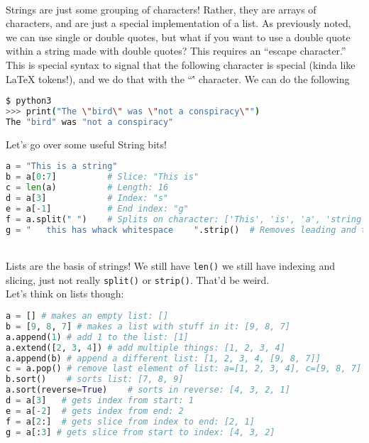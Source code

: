 \documentclass[12pt]{article}
\begin{document}
\\

Strings are just some grouping of characters! Rather, they are arrays of characters, and are just a special implementation of a list. As previously noted, we can use single or double quotes, but what if you want to use a double quote within a string made with double quotes? This requires an ``escape character.'' This is special syntax to signal that the following character is special (kinda like LaTeX tokens!), and we do that with the ``\'' character. We can do the following\\
\begin{lstlisting}[language=sh]
$ python3
>>> print("The \"bird\" was \"not a conspiracy\"")
The "bird" was "not a conspiracy"
\end{lstlisting}
Let's go over some useful String bits!\\
\begin{lstlisting}[language=Python]
a = "This is a string"
b = a[0:7]          # Slice: "This is"
c = len(a)          # Length: 16
d = a[3]            # Index: "s"
e = a[-1]           # End index: "g"
f = a.split(" ")    # Splits on character: ['This', 'is', 'a', 'string']
g = "   this has whack whitespace    ".strip()  # Removes leading and trailing whitespace
\end{lstlisting}

\\

Lists are the basis of strings! We still have \texttt{len()} we still have indexing and slicing, just not really \texttt{split()} or \texttt{strip()}. That'd be weird.\\
Let's think on lists though:\\
\begin{lstlisting}[language=Python]
a = [] # makes an empty list: []
b = [9, 8, 7] # makes a list with stuff in it: [9, 8, 7]
a.append(1) # add 1 to the list: [1]
a.extend([2, 3, 4]) # add multiple things: [1, 2, 3, 4]
a.append(b) # append a different list: [1, 2, 3, 4, [9, 8, 7]]
c = a.pop() # remove last element of list: a=[1, 2, 3, 4], c=[9, 8, 7]
b.sort()    # sorts list: [7, 8, 9]
a.sort(reverse=True)    # sorts in reverse: [4, 3, 2, 1]
d = a[3]   # gets index from start: 1
e = a[-2]  # gets index from end: 2
f = a[2:]  # gets slice from index to end: [2, 1]
g = a[:3] # gets slice from start to index: [4, 3, 2]
\end{lstlisting}

\\
\end{document}
